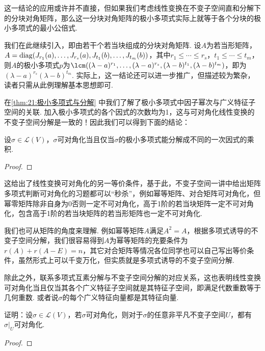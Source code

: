 这一结论的应用或许并不直接，但如果我们考虑线性变换在不变子空间直和分解下的分块对角矩阵，那么这一分块对角矩阵的极小多项式实际上就等于各个分块的极小多项式的最小公倍式.
\begin{example} \label{thm:21:若当形矩阵极小多项式}
    我们在此继续引入，即由若干个若当块组成的分块对角矩阵. 设$A$为若当形矩阵，$A=\operatorname{diag}(J_{r_1}(a),\ldots,J_{r_s}(a),J_{t_1}(b),\ldots,J_{t_m}(b))$，其中$r_1\leqslant\cdots\leqslant r_s$，$t_1\leqslant\cdots\leqslant t_m$，则$A$的极小多项式$p$为$\lcm((\lambda-a)^{r_1},\ldots,(\lambda-a)^{r_s},(\lambda-b)^{t_1},(\lambda-b)^{t_m})$，即为$(\lambda-a)^{r_s}(\lambda-b)^{t_m}$. 实际上，这一结论还可以进一步推广，但描述较为繁杂，读者只需从此例理解基本思想即可.
\end{example}
在\autoref{thm:21:极小多项式与分解} 中我们了解了极小多项式中因子幂次与广义特征子空间的关联. 加入极小多项式的各个因式的次数均为1，这与可对角化线性变换的不变子空间分解是一致的！因此我们可以得到下面的结论：
\begin{theorem}
    设$\sigma\in \mathcal{L}(V)$，$\sigma$可对角化当且仅当$\sigma$的极小多项式能分解成不同的一次因式的乘积.
\end{theorem}

\begin{proof}

\end{proof}

这给出了线性变换可对角化的另一等价条件，基于此，不变子空间一讲中给出矩阵多项式判断可对角化的习题都可以``秒杀''，例如幂等矩阵、对合矩阵可对角化，但幂零矩阵除非自身为0否则一定不可对角化，高于1阶的若当块矩阵一定不可对角化，包含高于1阶的若当块矩阵的若当形矩阵也一定不可对角化.

我们也可从矩阵的角度来理解. 例如幂等矩阵$A$满足$A^2=A$，根据多项式诱导的不变子空间分解，我们很容易得到$A$为幂等矩阵的充要条件为$r(A)+r(A-E)=n$，其它对合矩阵等情况各位同学也可以自己写出等价条件，虽然形式上可以千变万化，但实质就是多项式诱导的不变子空间分解.

除此之外，联系多项式互素分解与不变子空间分解的对应关系，这也表明线性变换可对角化当且仅当其各个广义特征子空间就是其特征子空间，即满足代数重数等于几何重数. 或者说$\sigma$的每个广义特征向量都是其特征向量.
\begin{example}
    证明：设$\sigma\in \mathcal{L}(V)$，若$\sigma$可对角化，则对于$\sigma$的任意非平凡不变子空间$U$，都有$\sigma\vert_U$可对角化.
\end{example}

\begin{proof}

\end{proof}

